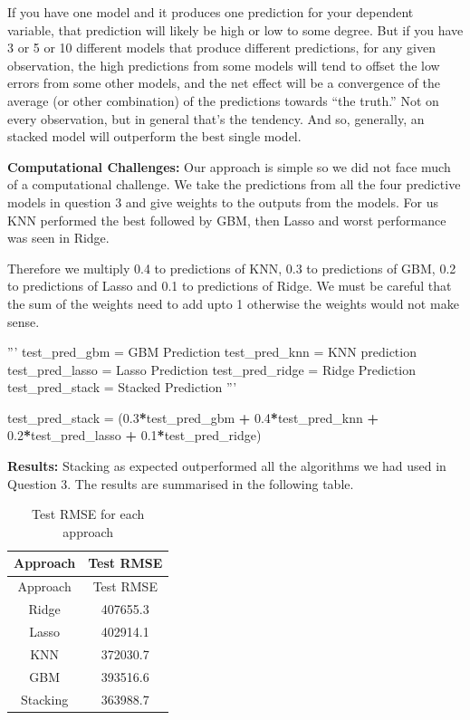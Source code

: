 \documentclass[]{article}
\newenvironment{Shaded}{\begin{snugshade}}{\end{snugshade}}
\newcommand{\FloatTok}[1]{\textcolor[rgb]{0.00,0.00,0.81}{#1}}
\newcommand{\StringTok}[1]{\textcolor[rgb]{0.31,0.60,0.02}{#1}}
\newcommand{\OperatorTok}[1]{\textcolor[rgb]{0.81,0.36,0.00}{\textbf{#1}}}
\newcommand{\NormalTok}[1]{#1}
\begin{document}
If you have one model and it produces one prediction for your dependent
variable, that prediction will likely be high or low to some degree. But
if you have 3 or 5 or 10 different models that produce different
predictions, for any given observation, the high predictions from some
models will tend to offset the low errors from some other models, and
the net effect will be a convergence of the average (or other
combination) of the predictions towards ``the truth.'' Not on every
observation, but in general that's the tendency. And so, generally, an
stacked model will outperform the best single model.

\textbf{Computational Challenges:} Our approach is simple so we did not
face much of a computational challenge. We take the predictions from all
the four predictive models in question 3 and give weights to the outputs
from the models. For us KNN performed the best followed by GBM, then
Lasso and worst performance was seen in Ridge.

Therefore we multiply 0.4 to predictions of KNN, 0.3 to predictions of
GBM, 0.2 to predictions of Lasso and 0.1 to predictions of Ridge. We
must be careful that the sum of the weights need to add upto 1 otherwise
the weights would not make sense.

\begin{Shaded}
\begin{Highlighting}[]
\StringTok{'''}
\StringTok{test_pred_gbm = GBM Prediction}
\StringTok{test_pred_knn = KNN prediction}
\StringTok{test_pred_lasso = Lasso Prediction}
\StringTok{test_pred_ridge = Ridge Prediction}
\StringTok{test_pred_stack = Stacked Prediction}
\StringTok{'''}

\NormalTok{test_pred_stack =}\StringTok{ }\NormalTok{(}\FloatTok{0.3}\OperatorTok{*}\NormalTok{test_pred_gbm }\OperatorTok{+}\StringTok{ }\FloatTok{0.4}\OperatorTok{*}\NormalTok{test_pred_knn }\OperatorTok{+}\StringTok{ }
\StringTok{                     }\FloatTok{0.2}\OperatorTok{*}\NormalTok{test_pred_lasso }\OperatorTok{+}\StringTok{ }\FloatTok{0.1}\OperatorTok{*}\NormalTok{test_pred_ridge)}
\end{Highlighting}
\end{Shaded}

\textbf{Results:} Stacking as expected outperformed all the algorithms
we had used in Question 3. The results are summarised in the following
table.

\begin{longtable}[]{@{}cc@{}}
\caption{Test RMSE for each approach}\tabularnewline
\toprule
Approach & Test RMSE\tabularnewline
\midrule
\endfirsthead
\toprule
Approach & Test RMSE\tabularnewline
\midrule
\endhead
Ridge & 407655.3\tabularnewline
Lasso & 402914.1\tabularnewline
KNN & 372030.7\tabularnewline
GBM & 393516.6\tabularnewline
Stacking & 363988.7\tabularnewline
\bottomrule
\end{longtable}
\end{document}
